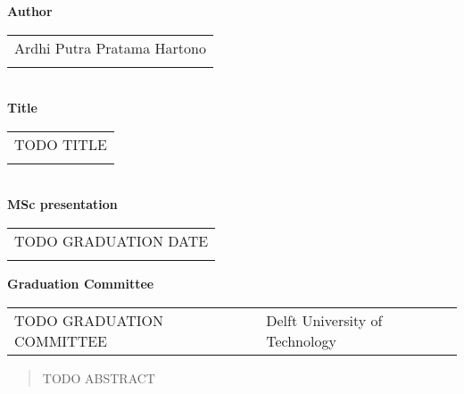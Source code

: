 \thispagestyle{empty}

\noindent \textbf{Author}\\
\begin{tabular}{l}
Ardhi Putra Pratama Hartono\\
\\
\end{tabular}\\
\noindent \textbf{Title}\\
\begin{tabular}{l}
TODO TITLE\\
\\
\end{tabular}\\
\noindent \textbf{MSc presentation}\\
\begin{tabular}{l}
TODO GRADUATION DATE\\
\\
\end{tabular}

\vspace{1.1cm}

\noindent \textbf{Graduation Committee}\\
\begin{tabular}{ll}
TODO GRADUATION COMMITTEE & Delft University of Technology \\
\end{tabular}

\begin{abstract} %
TODO ABSTRACT
\end{abstract}

\clearpage

